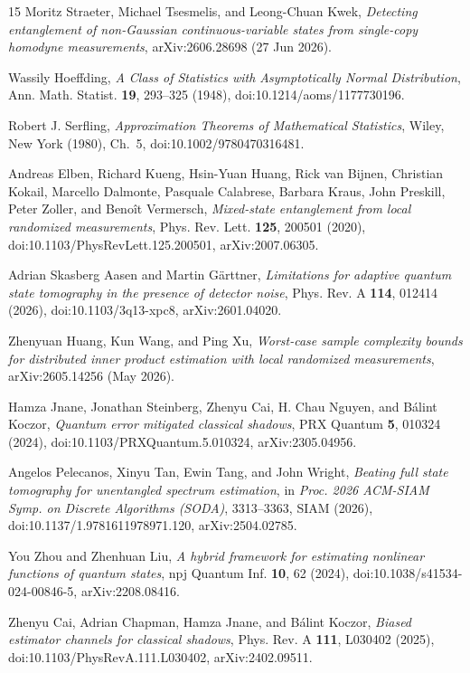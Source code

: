 \documentclass[a4paper,superscriptaddress,nofootinbib,onecolumn,nopdfoutputerror]{quantumarticle}
\begin{document}
\begin{thebibliography}{15}
Moritz Straeter, Michael Tsesmelis, and Leong-Chuan Kwek,
\emph{Detecting entanglement of non-Gaussian continuous-variable states from single-copy homodyne measurements},
arXiv:2606.28698 (27 Jun 2026).

Wassily Hoeffding,
\emph{A Class of Statistics with Asymptotically Normal Distribution},
Ann. Math. Statist. \textbf{19}, 293--325 (1948), doi:10.1214/aoms/1177730196.

Robert J. Serfling,
\emph{Approximation Theorems of Mathematical Statistics},
Wiley, New York (1980), Ch.~5, doi:10.1002/9780470316481.

Andreas Elben, Richard Kueng, Hsin-Yuan Huang, Rick van Bijnen, Christian Kokail, Marcello Dalmonte, Pasquale Calabrese, Barbara Kraus, John Preskill, Peter Zoller, and Beno\^it Vermersch,
\emph{Mixed-state entanglement from local randomized measurements},
Phys. Rev. Lett. \textbf{125}, 200501 (2020), doi:10.1103/PhysRevLett.125.200501, arXiv:2007.06305.

Adrian Skasberg Aasen and Martin G\"arttner,
\emph{Limitations for adaptive quantum state tomography in the presence of detector noise},
Phys. Rev. A \textbf{114}, 012414 (2026), doi:10.1103/3q13-xpc8, arXiv:2601.04020.

Zhenyuan Huang, Kun Wang, and Ping Xu,
\emph{Worst-case sample complexity bounds for distributed inner product estimation with local randomized measurements},
arXiv:2605.14256 (May 2026).

Hamza Jnane, Jonathan Steinberg, Zhenyu Cai, H. Chau Nguyen, and B\'alint Koczor,
\emph{Quantum error mitigated classical shadows},
PRX Quantum \textbf{5}, 010324 (2024), doi:10.1103/PRXQuantum.5.010324, arXiv:2305.04956.

Angelos Pelecanos, Xinyu Tan, Ewin Tang, and John Wright,
\emph{Beating full state tomography for unentangled spectrum estimation},
in \emph{Proc. 2026 ACM-SIAM Symp. on Discrete Algorithms (SODA)}, 3313--3363, SIAM (2026),
doi:10.1137/1.9781611978971.120, arXiv:2504.02785.

You Zhou and Zhenhuan Liu,
\emph{A hybrid framework for estimating nonlinear functions of quantum states},
npj Quantum Inf. \textbf{10}, 62 (2024), doi:10.1038/s41534-024-00846-5, arXiv:2208.08416.

Zhenyu Cai, Adrian Chapman, Hamza Jnane, and B\'alint Koczor,
\emph{Biased estimator channels for classical shadows},
Phys. Rev. A \textbf{111}, L030402 (2025), doi:10.1103/PhysRevA.111.L030402, arXiv:2402.09511.


\end{thebibliography}
\end{document}
